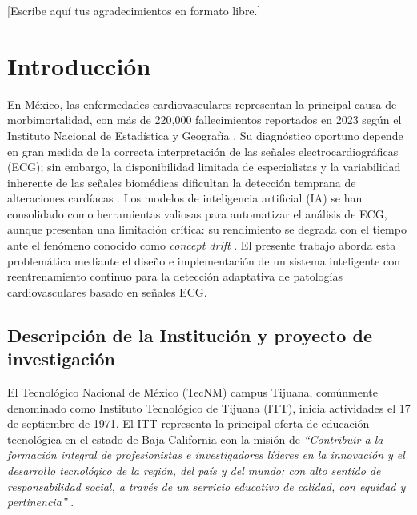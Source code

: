 \documentclass[11pt,spanish]{citedi}
\begin{document}
[Escribe aquí tus agradecimientos en formato libre.]


\chapter{Introducción}

En México, las enfermedades cardiovasculares representan la principal causa de morbimortalidad, con más de 220,000 fallecimientos reportados en 2023 según el Instituto Nacional de Estadística y Geografía \cite{INEGI2024}. Su diagnóstico oportuno depende en gran medida de la correcta interpretación de las señales electrocardiográficas (ECG); sin embargo, la disponibilidad limitada de especialistas y la variabilidad inherente de las señales biomédicas dificultan la detección temprana de alteraciones cardíacas \cite{WHO2024}. Los modelos de inteligencia artificial (IA) se han consolidado como herramientas valiosas para automatizar el análisis de ECG, aunque presentan una limitación crítica: su rendimiento se degrada con el tiempo ante el fenómeno conocido como \textit{concept drift} \cite{Reshad2025}. El presente trabajo aborda esta problemática mediante el diseño e implementación de un sistema inteligente con reentrenamiento continuo para la detección adaptativa de patologías cardiovasculares basado en señales ECG.

\section{Descripción de la Institución y proyecto de investigación}

El Tecnológico Nacional de México (TecNM) campus Tijuana, comúnmente denominado como Instituto Tecnológico de Tijuana (ITT), inicia actividades el 17 de septiembre de 1971. El ITT representa la principal oferta de educación tecnológica en el estado de Baja California con la misión de \textit{``Contribuir a la formación integral de profesionistas e investigadores líderes en la innovación y el desarrollo tecnológico de la región, del país y del mundo; con alto sentido de responsabilidad social, a través de un servicio educativo de calidad, con equidad y pertinencia''} \cite{ITT}.
\end{document}
